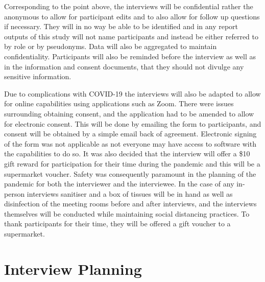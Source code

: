 \newline
\par Corresponding to the point above, the interviews will be confidential rather the anonymous to allow for participant edits and to also allow for follow up questions if necessary. They will in no way be able to be identified and in any report outputs of this study will not name participants and instead be either referred to by role or by pseudonyms. Data will also be aggregated to maintain confidentiality. Participants will also be reminded before the interview as well as in the information and consent documents, that they should not divulge any sensitive information. 
\newline
\par Due to complications with COVID-19 the interviews will also be adapted to allow for online capabilities using applications such as Zoom. There were issues surrounding obtaining consent, and the application had to be amended to allow for electronic consent. This will be done by emailing the form to participants, and consent will be obtained by a simple email back of agreement. Electronic signing of the form was not applicable as not everyone may have access to software with the capabilities to do so. It was also decided that the interview will offer a \$10 gift reward for participation for their time during the pandemic and this will be a supermarket voucher. Safety was consequently paramount in the planning of the pandemic for both the interviewer and the interviewee. In the case of any in-person interviews sanitiser and a box of tissues will be in hand as well as disinfection of the meeting rooms before and after interviews, and the interviews themselves will be conducted while maintaining social distancing practices. To thank participants for their time, they will be offered a gift voucher to a supermarket.


\section{Interview Planning}


